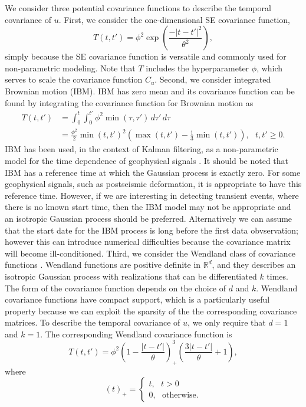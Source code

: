 \documentclass[10pt,a4paper]{article}
\begin{document}
We consider three potential covariance functions to describe the temporal covariance of $u$.  First, we consider the one-dimensional SE covariance function, 
\begin{equation}\label{eq:TimeSE}
T(t,t') = \phi^2\exp\left(\frac{-|t - t'|^2}{\theta^2}\right),
\end{equation}
simply because the SE covariance function is versatile and commonly used for non-parametric modeling. Note that $T$ includes the hyperparameter $\phi$, which serves to scale the covariance function $C_u$. Second, we consider integrated Brownian motion (IBM). IBM has zero mean and its covariance function can be found by integrating the covariance function for Brownian motion as
\begin{align}\label{eq:IBM}
T(t,t') &= \int_0^t \int_0^{t'} \phi^2 \min(\tau,\tau') \,d\tau'\,d\tau \\
        &= \frac{\phi^2}{2}\min(t,t')^2 \left(\max(t,t') - \frac{1}{3}\min(t,t')\right), \ \ \ t,t' \geq 0.
\end{align}
IBM has been used, in the context of Kalman filtering, as a non-parametric model for the time dependence of geophysical signals \citep[e.g.,][]{Segall1997,McGuire2003,Ohtani2010,Hines2016}. It should be noted that IBM has a reference time at which the Gaussian process is exactly zero. For some geophysical signals, such as postseismic deformation, it is appropriate to have this reference time. However, if we are interesting in detecting transient events, where there is no known start time, then the IBM model may not be appropriate and an isotropic Gaussian process should be preferred. Alternatively we can assume that the start date for the IBM process is long before the first data obvservation; however this can introduce numerical difficulties because the covariance matrix will become ill-conditioned. Third, we consider the Wendland class of covariance functions \citep{Wendland2005}. Wendland functions are positive definite in $\mathbb{R}^d$, and they describes an isotropic Gaussian process with realizations that can be differentiated $k$ times. The form of the covariance function depends on the choice of $d$ and $k$. Wendland covariance functions have compact support, which is a particularly useful property because we can exploit the sparsity of the the corresponding covariance matrices. To describe the temporal covariance of $u$, we only require that $d=1$ and $k=1$. The corresponding Wendland covariance function is 
\begin{equation}\label{eq:Wendland}
T(t,t') = \phi^2\left(1 - \frac{|t - t'|}{\theta}\right)^3_+ \left(\frac{3|t - t'|}{\theta} + 1\right), 
\end{equation}
where
\begin{equation}
(t)_+ = 
\begin{cases}
t, \ \ \ t > 0 \\
0, \ \ \ \mathrm{otherwise}.
\end{cases}
\end{equation}
\end{document}
